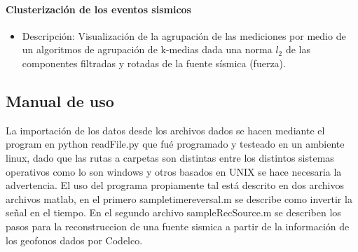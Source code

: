 \paragraph{Clusterización de los eventos sismicos}
 \begin{itemize}
   \item Descripción: Visualización de la agrupación de las mediciones por medio
   de un algoritmos de agrupación de k-medias dada una norma $l_2$ de las
   componentes filtradas y rotadas de la fuente sísmica (fuerza).
 \end{itemize}

\subsection{Manual de uso}
La importación de los datos desde los archivos dados se hacen mediante el
program en python readFile.py que fué programado y testeado en un ambiente
linux, dado que las rutas a carpetas son distintas entre los distintos sistemas
operativos como lo son windows y otros basados en UNIX se hace necesaria la
advertencia.
El uso del programa propiamente tal está descrito en dos archivos archivos
matlab, en el primero sampletimereversal.m se describe como invertir la señal en
el tiempo. En el segundo archivo sampleRecSource.m se describen los pasos para
la reconstruccion de una fuente sismica a partir de la información de los
geofonos dados por Codelco.






















